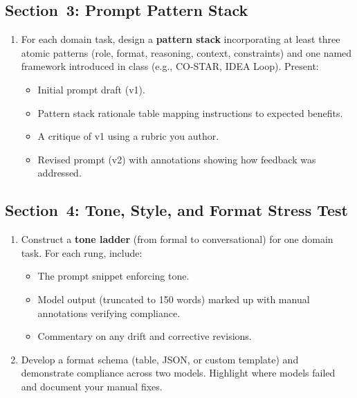 \documentclass[11pt]{article}
\begin{document}
\subsection{Section~3: Prompt Pattern Stack}
\begin{enumerate}[label=3.\arabic*]
    \item For each domain task, design a \textbf{pattern stack} incorporating at least three atomic patterns (role, format, reasoning, context, constraints) and one named framework introduced in class (e.g., CO-STAR, IDEA Loop). Present:
    \begin{itemize}
        \item Initial prompt draft (v1).
        \item Pattern stack rationale table mapping instructions to expected benefits.
    \item A critique of v1 using a rubric you author.
    \item Revised prompt (v2) with annotations showing how feedback was addressed.
    \end{itemize}
\end{enumerate}

\subsection{Section~4: Tone, Style, and Format Stress Test}
\begin{enumerate}[label=4.\arabic*]
    \item Construct a \textbf{tone ladder} (from formal to conversational) for one domain task. For each rung, include:
    \begin{itemize}
        \item The prompt snippet enforcing tone.
        \item Model output (truncated to 150 words) marked up with manual annotations verifying compliance.
        \item Commentary on any drift and corrective revisions.
    \end{itemize}
    \item Develop a format schema (table, JSON, or custom template) and demonstrate compliance across two models. Highlight where models failed and document your manual fixes.
\end{enumerate}
\end{document}
